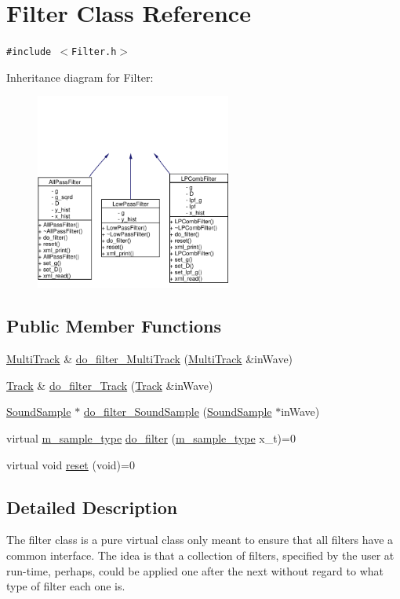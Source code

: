 \hypertarget{classFilter}{
\section{Filter Class Reference}
\label{classFilter}
}
{\tt \#include $<$Filter.h$>$}

Inheritance diagram for Filter:\begin{figure}[H]
\begin{center}
\leavevmode
\includegraphics[width=182pt]{classFilter__inherit__graph}
\end{center}
\end{figure}
\subsection*{Public Member Functions}
\begin{CompactItemize}
\item 
\hyperlink{classMultiTrack}{Multi\-Track} \& \hyperlink{classFilter_a0}{do\_\-filter\_\-Multi\-Track} (\hyperlink{classMultiTrack}{Multi\-Track} \&in\-Wave)
\item 
\hyperlink{classTrack}{Track} \& \hyperlink{classFilter_a1}{do\_\-filter\_\-Track} (\hyperlink{classTrack}{Track} \&in\-Wave)
\item 
\hyperlink{classSoundSample}{Sound\-Sample} $\ast$ \hyperlink{classFilter_a2}{do\_\-filter\_\-Sound\-Sample} (\hyperlink{classSoundSample}{Sound\-Sample} $\ast$in\-Wave)
\item 
virtual \hyperlink{Types_8h_a0}{m\_\-sample\_\-type} \hyperlink{classFilter_a3}{do\_\-filter} (\hyperlink{Types_8h_a0}{m\_\-sample\_\-type} x\_\-t)=0
\item 
virtual void \hyperlink{classFilter_a4}{reset} (void)=0
\end{CompactItemize}


\subsection{Detailed Description}
The filter class is a pure virtual class only meant to ensure that all filters have a common interface. The idea is that a collection of filters, specified by the user at run-time, perhaps, could be applied one after the next without regard to what type of filter each one is.

